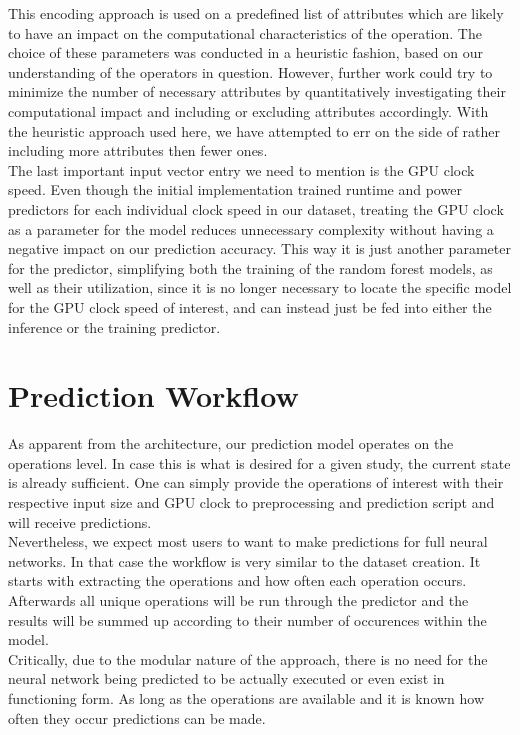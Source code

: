 This encoding approach is used on a predefined list of attributes which are likely to have an impact on the computational characteristics of the operation. The choice of these parameters was conducted in a heuristic fashion, based on our understanding of the operators in question. However, further work could try to minimize the number of necessary attributes by quantitatively investigating their computational impact and including or excluding attributes accordingly. With the heuristic approach used here, we have attempted to err on the side of rather including more attributes then fewer ones. \\
The last important input vector entry we need to mention is the GPU clock speed. Even though the initial implementation trained runtime and power predictors for each individual clock speed in our dataset, treating the GPU clock as a parameter for the model reduces unnecessary complexity without having a negative impact on our prediction accuracy. This way it is just another parameter for the predictor, simplifying both the training of the random forest models, as well as their utilization, since it is no longer necessary to locate the specific model for the GPU clock speed of interest, and can instead just be fed into either the inference or the training predictor.


\section{Prediction Workflow}
As apparent from the architecture, our prediction model operates on the operations level. In case this is what is desired for a given study, the current state is already sufficient. One can simply provide the operations of interest with their respective input size and GPU clock to preprocessing and prediction script and will receive predictions. \\
Nevertheless, we expect most users to want to make predictions for full neural networks. In that case the workflow is very similar to the dataset creation. It starts with extracting the operations and how often each operation occurs. Afterwards all unique operations will be run through the predictor and the results will be summed up according to their number of occurences within the model.\\
Critically, due to the modular nature of the approach, there is no need for the neural network being predicted to be actually executed or even exist in functioning form. As long as the operations are available and it is known how often they occur predictions can be made.